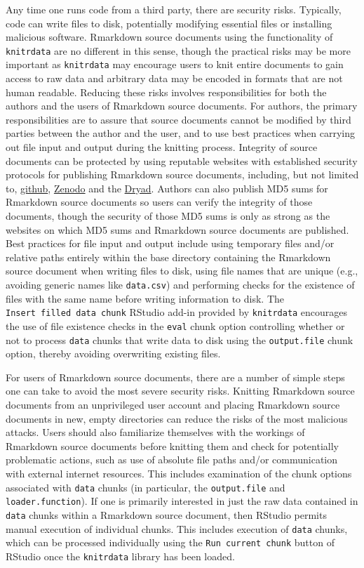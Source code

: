 Any time one runs code from a third party, there are security risks. Typically, code can write files to disk, potentially modifying essential files or installing malicious software. Rmarkdown source documents using the functionality of \texttt{knitrdata} are no different in this sense, though the practical risks may be more important as \texttt{knitrdata} may encourage users to knit entire documents to gain access to raw data and arbitrary data may be encoded in formats that are not human readable. Reducing these risks involves responsibilities for both the authors and the users of Rmarkdown source documents. For authors, the primary responsibilities are to assure that source documents cannot be modified by third parties between the author and the user, and to use best practices when carrying out file input and output during the knitting process. Integrity of source documents can be protected by using reputable websites with established security protocols for publishing Rmarkdown source documents, including, but not limited to, \href{https://github.com/}{github}, \href{https://zenodo.org/}{Zenodo} and the \href{https://datadryad.org}{Dryad}. Authors can also publish MD5 sums for Rmarkdown source documents so users can verify the integrity of those documents, though the security of those MD5 sums is only as strong as the websites on which MD5 sums and Rmarkdown source documents are published. Best practices for file input and output include using temporary files and/or relative paths entirely within the base directory containing the Rmarkdown source document when writing files to disk, using file names that are unique (e.g., avoiding generic names like \texttt{data.csv}) and performing checks for the existence of files with the same name before writing information to disk. The \texttt{Insert\ filled\ data\ chunk} RStudio add-in provided by \texttt{knitrdata} encourages the use of file existence checks in the \texttt{eval} chunk option controlling whether or not to process \texttt{data} chunks that write data to disk using the \texttt{output.file} chunk option, thereby avoiding overwriting existing files.

For users of Rmarkdown source documents, there are a number of simple steps one can take to avoid the most severe security risks. Knitting Rmarkdown source documents from an unprivileged user account and placing Rmarkdown source documents in new, empty directories can reduce the risks of the most malicious attacks. Users should also familiarize themselves with the workings of Rmarkdown source documents before knitting them and check for potentially problematic actions, such as use of absolute file paths and/or communication with external internet resources. This includes examination of the chunk options associated with \texttt{data} chunks (in particular, the \texttt{output.file} and \texttt{loader.function}). If one is primarily interested in just the raw data contained in \texttt{data} chunks within a Rmarkdown source document, then RStudio permits manual execution of individual chunks. This includes execution of \texttt{data} chunks, which can be processed individually using the \texttt{Run\ current\ chunk} button of RStudio once the \texttt{knitrdata} library has been loaded.

